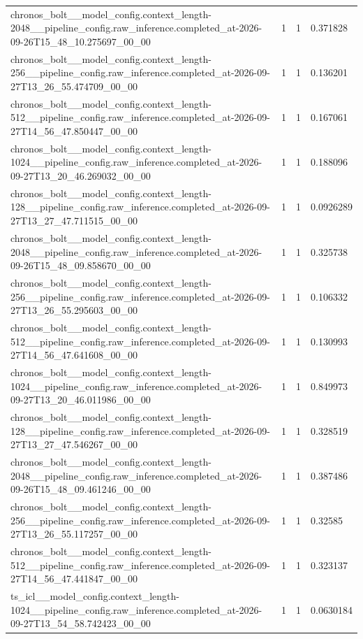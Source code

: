 \begin{tabular}{llll}
chronos\_bolt\_\_model\_config.context\_length-2048\_\_pipeline\_config.raw\_inference.completed\_at-2026-09-26T15\_48\_10.275697\_00\_00 & 1 & 1 & 0.371828 \\
chronos\_bolt\_\_model\_config.context\_length-256\_\_pipeline\_config.raw\_inference.completed\_at-2026-09-27T13\_26\_55.474709\_00\_00 & 1 & 1 & 0.136201 \\
chronos\_bolt\_\_model\_config.context\_length-512\_\_pipeline\_config.raw\_inference.completed\_at-2026-09-27T14\_56\_47.850447\_00\_00 & 1 & 1 & 0.167061 \\
chronos\_bolt\_\_model\_config.context\_length-1024\_\_pipeline\_config.raw\_inference.completed\_at-2026-09-27T13\_20\_46.269032\_00\_00 & 1 & 1 & 0.188096 \\
chronos\_bolt\_\_model\_config.context\_length-128\_\_pipeline\_config.raw\_inference.completed\_at-2026-09-27T13\_27\_47.711515\_00\_00 & 1 & 1 & 0.0926289 \\
chronos\_bolt\_\_model\_config.context\_length-2048\_\_pipeline\_config.raw\_inference.completed\_at-2026-09-26T15\_48\_09.858670\_00\_00 & 1 & 1 & 0.325738 \\
chronos\_bolt\_\_model\_config.context\_length-256\_\_pipeline\_config.raw\_inference.completed\_at-2026-09-27T13\_26\_55.295603\_00\_00 & 1 & 1 & 0.106332 \\
chronos\_bolt\_\_model\_config.context\_length-512\_\_pipeline\_config.raw\_inference.completed\_at-2026-09-27T14\_56\_47.641608\_00\_00 & 1 & 1 & 0.130993 \\
chronos\_bolt\_\_model\_config.context\_length-1024\_\_pipeline\_config.raw\_inference.completed\_at-2026-09-27T13\_20\_46.011986\_00\_00 & 1 & 1 & 0.849973 \\
chronos\_bolt\_\_model\_config.context\_length-128\_\_pipeline\_config.raw\_inference.completed\_at-2026-09-27T13\_27\_47.546267\_00\_00 & 1 & 1 & 0.328519 \\
chronos\_bolt\_\_model\_config.context\_length-2048\_\_pipeline\_config.raw\_inference.completed\_at-2026-09-26T15\_48\_09.461246\_00\_00 & 1 & 1 & 0.387486 \\
chronos\_bolt\_\_model\_config.context\_length-256\_\_pipeline\_config.raw\_inference.completed\_at-2026-09-27T13\_26\_55.117257\_00\_00 & 1 & 1 & 0.32585 \\
chronos\_bolt\_\_model\_config.context\_length-512\_\_pipeline\_config.raw\_inference.completed\_at-2026-09-27T14\_56\_47.441847\_00\_00 & 1 & 1 & 0.323137 \\
ts\_icl\_\_model\_config.context\_length-1024\_\_pipeline\_config.raw\_inference.completed\_at-2026-09-27T13\_54\_58.742423\_00\_00 & 1 & 1 & 0.0630184 \\

\end{tabular}
